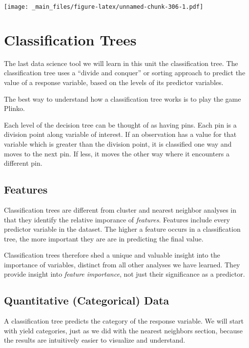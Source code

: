 \documentclass[
]{book}
\begin{document}
\texttt{[image: \_main\_files/figure-latex/unnamed-chunk-306-1.pdf]}

\hypertarget{classification-trees}{%
\section{Classification Trees}\label{classification-trees}}

The last data science tool we will learn in this unit the classification tree. The classification tree uses a ``divide and conquer'' or sorting approach to predict the value of a response variable, based on the levels of its predictor variables.

The best way to understand how a classification tree works is to play the game Plinko.

Each level of the decision tree can be thought of as having pins. Each pin is a division point along variable of interest. If an observation has a value for that variable which is greater than the division point, it is classified one way and moves to the next pin. If less, it moves the other way where it encounters a different pin.

\hypertarget{features}{%
\subsection{Features}\label{features}}

Classification trees are different from cluster and nearest neighbor analyses in that they identify the relative imporance of \emph{features}. Features include every predictor variable in the dataset. The higher a feature occurs in a classification tree, the more important they are are in predicting the final value.

Classification trees therefore shed a unique and valuable insight into the importance of variables, distinct from all other analyses we have learned. They provide insight into \emph{feature importance}, not just their significance as a predictor.

\hypertarget{quantitative-categorical-data}{%
\subsection{Quantitative (Categorical) Data}\label{quantitative-categorical-data}}

A classification tree predicts the category of the response variable. We will start with yield categories, just as we did with the nearest neighbors section, because the results are intuitively easier to visualize and understand.
\end{document}
